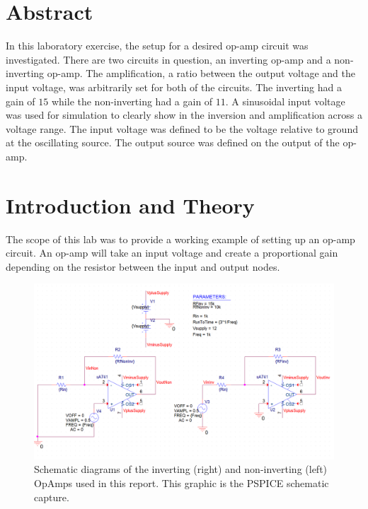 \documentclass[11pt]{article}
\begin{document}
\section*{Abstract}
\normalsize

In this laboratory exercise, the setup for a desired op-amp circuit was investigated. There are two circuits in question, an inverting op-amp and a non-inverting op-amp. The amplification, a ratio between the output voltage and the input voltage, was arbitrarily set for both of the circuits. The inverting had a gain of $15$ while the non-inverting had a gain of $11$. A sinusoidal input voltage was used for simulation to clearly show in the inversion and amplification across a voltage range. The input voltage was defined to be the voltage relative to ground at the oscillating source. The output source was defined on the output of the op-amp.

\section {Introduction and Theory}

The scope of this lab was to provide a working example of setting up an op-amp circuit. An op-amp will take an input voltage and create a proportional gain depending on the resistor between the input and output nodes.

\begin{figure}[h!]
	\includegraphics[width=\textwidth]{schematic}
	\caption{Schematic diagrams of the inverting (right) and non-inverting (left) OpAmps used in this report. This graphic is the PSPICE schematic capture.}
	\label{Fig:PSPICEOpAmpsGraphic}
\end{figure}
\end{document}
